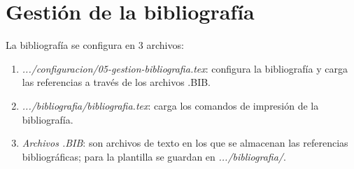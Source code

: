 \chapter{Gestión de la bibliografía}
La bibliografía se configura en 3 archivos:
\begin{enumerate}
	\item \textit{.../configuracion/05-gestion-bibliografia.tex}: configura la bibliografía y carga las referencias a través de los archivos .BIB.
	\item \textit{.../bibliografia/bibliografia.tex}: carga los comandos de impresión de la bibliografía.
	\item \textit{Archivos .BIB}: son archivos de texto en los que se almacenan las referencias bibliográficas; para la plantilla se guardan en \textit{.../bibliografia/}.
\end{enumerate}
%

